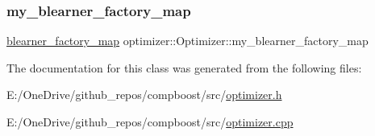 \subsubsection{\texorpdfstring{my\+\_\+blearner\+\_\+factory\+\_\+map}{my\_blearner\_factory\_map}}
{\footnotesize\ttfamily \mbox{\hyperlink{baselearner__factory__list_8h_a058570e00ae11b882cfed36eb40be025}{blearner\+\_\+factory\+\_\+map}} optimizer\+::\+Optimizer\+::my\+\_\+blearner\+\_\+factory\+\_\+map\hspace{0.3cm}{\ttfamily [protected]}}



The documentation for this class was generated from the following files\+:\begin{DoxyCompactItemize}
\item 
E\+:/\+One\+Drive/github\+\_\+repos/compboost/src/\mbox{\hyperlink{optimizer_8h}{optimizer.\+h}}\item 
E\+:/\+One\+Drive/github\+\_\+repos/compboost/src/\mbox{\hyperlink{optimizer_8cpp}{optimizer.\+cpp}}\end{DoxyCompactItemize}
